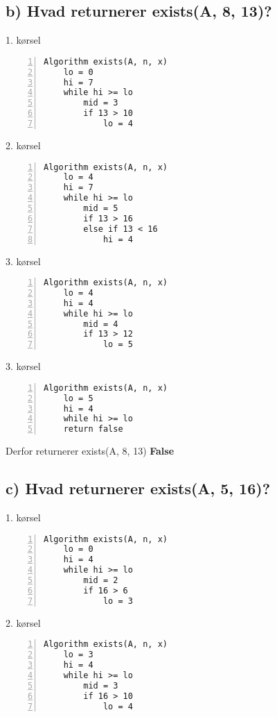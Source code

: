 \documentclass{article}
\begin{document}
\subsection*{b) Hvad returnerer exists(A, 8, 13)?} 
  
 
1. kørsel
\begin{Verbatim}[frame=lines,label=Algorithm exists,labelposition=topline, numbers=left]
Algorithm exists(A, n, x)
    lo = 0
    hi = 7
    while hi >= lo
        mid = 3 
        if 13 > 10 
            lo = 4 
\end{Verbatim}

2. kørsel
\begin{Verbatim}[frame=lines,label=Algorithm exists,labelposition=topline, numbers=left]
Algorithm exists(A, n, x)
    lo = 4
    hi = 7
    while hi >= lo
        mid = 5 
        if 13 > 16
        else if 13 < 16
            hi = 4 
\end{Verbatim}

3. kørsel
\begin{Verbatim}[frame=lines,label=Algorithm exists,labelposition=topline, numbers=left]
Algorithm exists(A, n, x)
    lo = 4
    hi = 4
    while hi >= lo
        mid = 4 
        if 13 > 12
            lo = 5 
\end{Verbatim}

3. kørsel
\begin{Verbatim}[frame=lines,label=Algorithm exists,labelposition=topline, numbers=left]
Algorithm exists(A, n, x)
    lo = 5
    hi = 4
    while hi >= lo
    return false 
\end{Verbatim}

Derfor returnerer exists(A, 8, 13) \textbf{False} \newpage

\subsection*{c) Hvad returnerer exists(A, 5, 16)?} 

 
1. kørsel
\begin{Verbatim}[frame=lines,label=Algorithm exists,labelposition=topline, numbers=left]
Algorithm exists(A, n, x)
    lo = 0
    hi = 4
    while hi >= lo
        mid = 2
        if 16 > 6 
            lo = 3
\end{Verbatim}

2. kørsel
\begin{Verbatim}[frame=lines,label=Algorithm exists,labelposition=topline, numbers=left]
Algorithm exists(A, n, x)
    lo = 3
    hi = 4
    while hi >= lo
        mid = 3
        if 16 > 10 
            lo = 4
\end{Verbatim}
\end{document}
